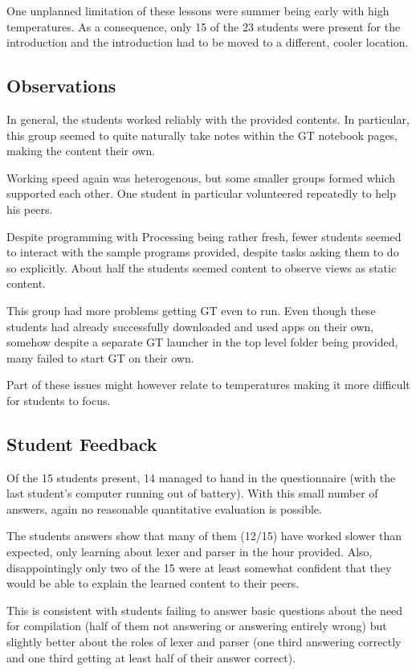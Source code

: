One unplanned limitation of these lessons were summer being early with high temperatures. As a consequence, only 15 of the 23 students were present for the introduction and the introduction had to be moved to a different, cooler location.


\subsection{Observations}

In general, the students worked reliably with the provided contents. In particular, this group seemed to quite naturally take notes within the \ac{GT} notebook pages, making the content their own.

Working speed again was heterogenous, but some smaller groups formed which supported each other. One student in particular volunteered repeatedly to help his peers.

Despite programming with Processing being rather fresh, fewer students seemed to interact with the sample programs provided, despite tasks asking them to do so explicitly. About half the students seemed content to observe views as static content.

This group had more problems getting \ac{GT} even to run. Even though these students had already successfully downloaded and used apps on their own, somehow despite a separate \ac{GT} launcher in the top level folder being provided, many failed to start \ac{GT} on their own.

Part of these issues might however relate to temperatures making it more difficult for students to focus.


\subsection{Student Feedback}

Of the 15 students present, 14 managed to hand in the questionnaire (with the last student's computer running out of battery). With this small number of answers, again no reasonable quantitative evaluation is possible.

The students answers show that many of them (12/15) have worked slower than expected, only learning about lexer and parser in the hour provided. Also, disappointingly only two of the 15 were at least somewhat confident that they would be able to explain the learned content to their peers.

This is consistent with students failing to answer basic questions about the need for compilation (half of them not answering or answering entirely wrong) but slightly better about the roles of lexer and parser (one third answering correctly and one third getting at least half of their answer correct).

